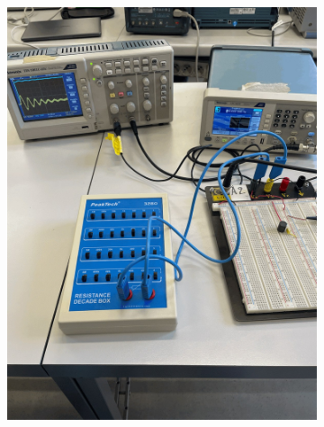 \documentclass[notitlepage]{report}
\numberwithin{equation}{section}
\theoremstyle{plain}
\theoremstyle{definition}
\theoremstyle{remark}
\begin{document}
\begin{figure}[h!]
    \centering
    \begin{subfigure}[h]{0.45\textwidth}
        \includegraphics[width=\textwidth]{figures/RLC_setup_1.jpg}\caption{}\label{fig:setup1.21}
    \end{subfigure}
    \begin{subfigure}[h]{0.45\textwidth}

\end{subfigure}
\end{figure}
\end{document}
